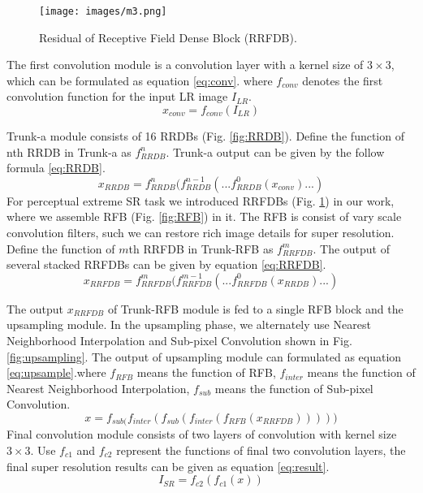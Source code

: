 \documentclass[10pt,twocolumn,letterpaper]{article}
\begin{document}
\begin{figure}[htbp]
\centering 
\texttt{[image: images/m3.png]}
\caption{Residual of Receptive Field Dense Block (RRFDB).}
\label{fig:RRFDB}
\end{figure}


The first convolution module is a convolution layer with a kernel size of $3\times3$, which can be formulated as equation \eqref{eq:conv}. where $f_{conv}$ denotes the first convolution function for the input LR image $I_{LR}$.
\begin{equation}
    x_{conv}=f_{conv}(I_{LR}) \label{eq:conv}
\end{equation}

 Trunk-a module consists of 16 RRDBs (Fig. \ref{fig:RRDB}). Define the function of nth RRDB in Trunk-a as $f_{RRDB}^n$. Trunk-a output can be given by the follow formula \eqref{eq:RRDB}.
\begin{equation}
    x_{RRDB}=f_{RRDB}^n(f_{RRDB}^{n-1}(...f_{RRDB}^0(x_{conv})...) \label{eq:RRDB}
\end{equation}
For perceptual extreme SR task we introduced RRFDBs (Fig. \ref{fig:RRFDB}) in our work, where we assemble RFB\cite{liu2018receptive} (Fig. \ref{fig:RFB}) in it. The RFB is consist of vary scale convolution filters, such we can restore rich image details for super resolution. Define the function of $m$th RRFDB in Trunk-RFB as $f_{RRFDB}^m$. The output of several stacked RRFDBs can be given by equation \eqref{eq:RRFDB}.
\begin{equation}
    x_{RRFDB}=f_{RRFDB}^m(f_{RRFDB}^{m-1}(...f_{RRFDB}^0(x_{RRDB})...) \label{eq:RRFDB}
\end{equation}

The output $x_{RRFDB}$ of Trunk-RFB module is fed to a single RFB block and the upsampling module. In the upsampling phase, we alternately use Nearest Neighborhood Interpolation and  Sub-pixel Convolution\cite{shi2016real} shown in Fig. \ref{fig:upsampling}. The output of upsampling module can formulated as equation \eqref{eq:upsample}.where $f_{RFB}$ means the function of RFB, $f_{inter}$ means the function of Nearest Neighborhood Interpolation, $f_{sub}$ means the function of Sub-pixel Convolution.
\begin{equation}
    x=f_{sub(}f_{inter}(f_{sub}(f_{inter}(f_{RFB}(x_{RRFDB}))))) \label{eq:upsample}
\end{equation}
 Final convolution module consists of two layers of convolution with kernel size $3\times3$. Use $f_{c1}$ and $f_{c2}$ represent the functions of final two convolution layers, the final super resolution results can be given as equation \eqref{eq:result}.
\begin{equation}
    I_{SR}=f_{c2}(f_{c1}(x)) \label{eq:result}
\end{equation}
\end{document}
